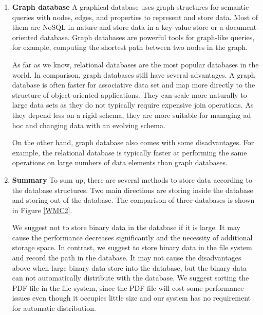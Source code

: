 \begin{enumerate}
	
	
	\item\textbf{Graph database}
	\setlength{\parindent}{1em}	
	A graphical database uses graph structures for semantic queries with nodes, edges, and properties to represent and store data.
	Most of them are NoSQL in nature and store data in a key-value store or a document-oriented database.
	Graph databases are powerful tools for graph-like queries, for example, computing the shortest path between two nodes in the graph.
	
	As far as we know, relational databases are the most popular databases in the world.
	In comparison, graph databases still have several advantages.
	A graph database is often faster for associative data set and map more directly to the structure of object-oriented applications.
	They can scale more naturally to large data sets as they do not typically require expensive join operations.
	As they depend less on a rigid schema, they are more suitable for managing ad hoc and changing data with an evolving schema.
	
	On the other hand, graph database also comes with some disadvantages.
	For example, the relational database is typically faster at performing the same operations on large numbers of data elements than graph databases.
	
	\item\textbf{Summary}
	\setlength{\parindent}{1em}	
	To sum up, there are several methods to store data according to the database structures.
	Two main directions are storing inside the database and storing out of the database.
	The comparison of three databases is shown in Figure \ref{WMC2}.
	
	We suggest not to store binary data in the database if it is large.
	It may cause the performance decreases significantly and the necessity of additional storage space.
	In contrast, we suggest to store binary data in the file system and record the path in the database.
	It may not cause the disadvantages above when large binary data store into the database, 
	but the binary data can not automatically distribute with the database.
	We suggest sorting the PDF file in the file system, 
	since the PDF file will cost some performance issues even though it occupies little size and our system has no requirement for automatic distribution.
	

\end{enumerate}
